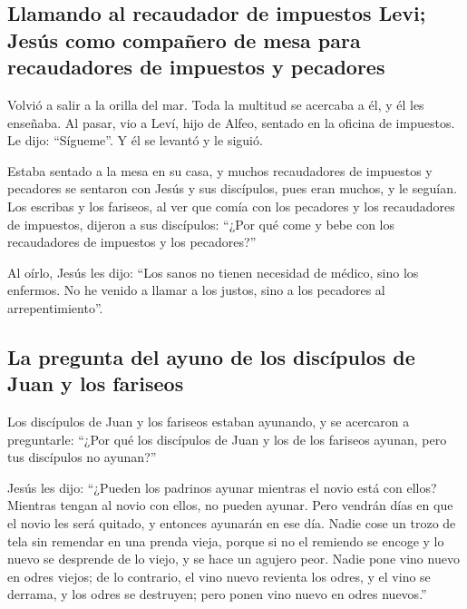 \begin{paracol}{2}
\hypertarget{llamando-al-recaudador-de-impuestos-levi-jesuxfas-como-compauxf1ero-de-mesa-para-recaudadores-de-impuestos-y-pecadores}{%
\subsection{Llamando al recaudador de impuestos Levi; Jesús como
compañero de mesa para recaudadores de impuestos y
pecadores}\label{llamando-al-recaudador-de-impuestos-levi-jesuxfas-como-compauxf1ero-de-mesa-para-recaudadores-de-impuestos-y-pecadores}}

 Volvió a salir a la orilla del mar. Toda la multitud se
acercaba a él, y él les enseñaba.  Al pasar, vio a Leví,
hijo de Alfeo, sentado en la oficina de impuestos. Le dijo: ``Sígueme''.
Y él se levantó y le siguió.

 Estaba sentado a la mesa en su casa, y muchos
recaudadores de impuestos y pecadores se sentaron con Jesús y sus
discípulos, pues eran muchos, y le seguían.  Los escribas
y los fariseos, al ver que comía con los pecadores y los recaudadores de
impuestos, dijeron a sus discípulos: ``¿Por qué come y bebe con los
recaudadores de impuestos y los pecadores?''

 Al oírlo, Jesús les dijo: ``Los sanos no tienen
necesidad de médico, sino los enfermos. No he venido a llamar a los
justos, sino a los pecadores al arrepentimiento''.

\hypertarget{la-pregunta-del-ayuno-de-los-discuxedpulos-de-juan-y-los-fariseos}{%
\subsection{La pregunta del ayuno de los discípulos de Juan y los
fariseos}\label{la-pregunta-del-ayuno-de-los-discuxedpulos-de-juan-y-los-fariseos}}

 Los discípulos de Juan y los fariseos estaban ayunando,
y se acercaron a preguntarle: ``¿Por qué los discípulos de Juan y los de
los fariseos ayunan, pero tus discípulos no ayunan?''

 Jesús les dijo: ``¿Pueden los padrinos ayunar mientras
el novio está con ellos? Mientras tengan al novio con ellos, no pueden
ayunar.  Pero vendrán días en que el novio les será
quitado, y entonces ayunarán en ese día.  Nadie cose un
trozo de tela sin remendar en una prenda vieja, porque si no el remiendo
se encoge y lo nuevo se desprende de lo viejo, y se hace un agujero
peor.  Nadie pone vino nuevo en odres viejos; de lo
contrario, el vino nuevo revienta los odres, y el vino se derrama, y los
odres se destruyen; pero ponen vino nuevo en odres nuevos.''


\end{paracol}
